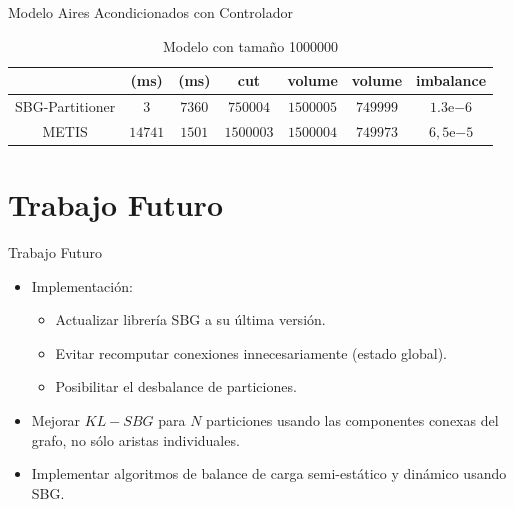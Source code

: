 \begin{frame}{Modelo Aires Acondicionados con Controlador}
\begin{table}[H]
{\begin{tabular}{*{7}{c}}
        \multicolumn{1}{c}{\textbf{ }} & \multicolumn{1}{c}{\textbf{(ms)}} & \multicolumn{1}{c}{\textbf{(ms)}} & \multicolumn{1}{c}{\textbf{cut}} & \multicolumn{1}{c}{\textbf{volume}} & \multicolumn{1}{c}{\textbf{volume}} & \multicolumn{1}{c}{\textbf{imbalance}} \\
    
        \midrule
        SBG-Partitioner & $3$ & $7360$ & $750004$ & $1500005$ & $749999$ & $1.3\mathrm{e}{-6}$ \\
        METIS & $14741$ & $1501$ & $1500003$ & $1500004$ & $749973$ & $6,5\mathrm{e}\mathrm{-5}$ \\
        \bottomrule
        \end{tabular}}
        \caption{Modelo con tamaño 1000000}
    \end{table}

\end{frame}



\section{Trabajo Futuro}



\begin{frame}{Trabajo Futuro}

    \begin{itemize}
        \item Implementación:
    
        \begin{itemize}
            \item Actualizar librería SBG a su última versión.
            \item Evitar recomputar conexiones innecesariamente (estado global).
            \item Posibilitar el desbalance de particiones.
        \end{itemize}

        \item Mejorar $KL-SBG$ para $N$ particiones usando las componentes conexas
        del grafo, no sólo aristas individuales.
    
        \item Implementar algoritmos de balance de carga semi-estático y dinámico
        usando SBG.
    \end{itemize}

\end{frame}